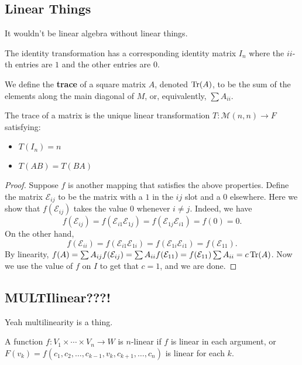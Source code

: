 \subsection{Linear Things}
It wouldn't be linear algebra without linear things.
\begin{df}
The identity transformation has a corresponding identity matrix $I_n$
where the $ii$-th entries are $1$ and the other entries are $0$.
\end{df}

\begin{df}
We define the \textbf{trace} of a square matrix $A$, denoted $\operatorname{Tr}(A)$,
to be the sum of the elements along the main diagonal of $M$, or,
equivalently, $\sum A_{ii}$.
\end{df}

\begin{prop}
The trace of a matrix is the unique linear transformation $T :
\mathcal{M}(n, n) \rightarrow F$ satisfying:
\begin{itemize}
\item $T(I_n) = n$
\item $T(AB) = T(BA)$
\end{itemize}
\end{prop}

\begin{proof}
Suppose $f$ is another mapping that satisfies the above properties.
Define the matrix $\mathcal{E}_{ij}$ to be the matrix with a $1$ in the
$ij$ slot and a $0$ elsewhere. Here we show that $f(\mathcal{E}_{ij})$
takes the value $0$ whenever $i \neq j$. Indeed, we have
\[ f(\mathcal{E}_{ij}) = f(\mathcal{E}_{i1} \mathcal{E}_{1j}) =
f(\mathcal{E}_{1j} \mathcal{E}_{i1}) = f(0) = 0. \]
On the other hand,
\[ f(\mathcal{E}_{ii}) = f(\mathcal{E}_{i1} \mathcal{E}_{1i}) =
f(\mathcal{E}_{1i} \mathcal{E}_{i1}) = f(\mathcal{E}_{11}). \]
By linearity, $f(A) = \sum A_{ij} f(\mathcal{E}_{ij}) = \sum A_{ii}
f(\mathcal{E}_{11}) = f(\mathcal{E}_{11}) \sum A_{ii} = c \operatorname{Tr}(A)$. Now
we use the value of $f$ on $I$ to get that $c = 1$, and we are done.
\end{proof}

\subsection{MULTIlinear???!}
Yeah multilinearity is a thing.

\begin{df}
A function $f : V_1 \times \cdots \times V_n \rightarrow W$ is
$n$-linear if $f$ is linear in each argument, or $F(v_k) = f(c_1, c_2,
\dots, c_{k - 1}, v_k, c_{k + 1}, \dots, c_n)$ is linear for each $k$.
\end{df}

